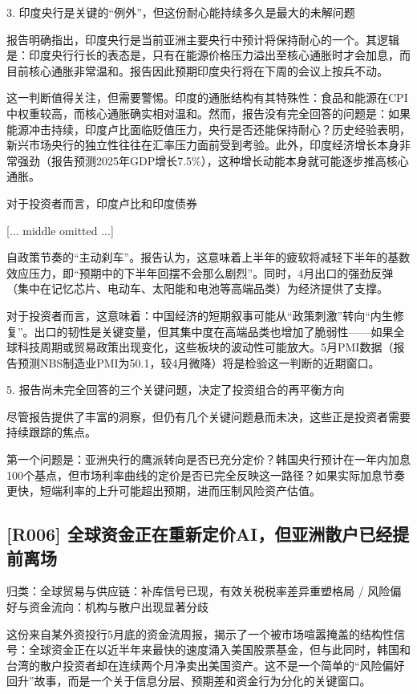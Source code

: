 \documentclass[11pt]{ctexart}
\begin{document}
3. 印度央行是关键的“例外”，但这份耐心能持续多久是最大的未解问题

报告明确指出，印度央行是当前亚洲主要央行中预计将保持耐心的一个。其逻辑是：印度央行行长的表态是，只有在能源价格压力溢出至核心通胀时才会加息，而目前核心通胀非常温和。报告因此预期印度央行将在下周的会议上按兵不动。

这一判断值得关注，但需要警惕。印度的通胀结构有其特殊性：食品和能源在CPI中权重较高，而核心通胀确实相对温和。然而，报告没有完全回答的问题是：如果能源冲击持续，印度卢比面临贬值压力，央行是否还能保持耐心？历史经验表明，新兴市场央行的独立性往往在汇率压力面前受到考验。此外，印度经济增长本身非常强劲（报告预测2025年GDP增长7.5\%），这种增长动能本身就可能逐步推高核心通胀。

对于投资者而言，印度卢比和印度债券

[... middle omitted ...]

自政策节奏的“主动刹车”。报告认为，这意味着上半年的疲软将减轻下半年的基数效应压力，即“预期中的下半年回摆不会那么剧烈”。同时，4月出口的强劲反弹（集中在记忆芯片、电动车、太阳能和电池等高端品类）为经济提供了支撑。

对于投资者而言，这意味着：中国经济的短期叙事可能从“政策刺激”转向“内生修复”。出口的韧性是关键变量，但其集中度在高端品类也增加了脆弱性——如果全球科技周期或贸易政策出现变化，这些板块的波动性可能放大。5月PMI数据（报告预测NBS制造业PMI为50.1，较4月微降）将是检验这一判断的近期窗口。

5. 报告尚未完全回答的三个关键问题，决定了投资组合的再平衡方向

尽管报告提供了丰富的洞察，但仍有几个关键问题悬而未决，这些正是投资者需要持续跟踪的焦点。

第一个问题是：亚洲央行的鹰派转向是否已充分定价？韩国央行预计在一年内加息100个基点，但市场利率曲线的定价是否已完全反映这一路径？如果实际加息节奏更快，短端利率的上升可能超出预期，进而压制风险资产估值。

\subsection{[R006] 全球资金正在重新定价AI，但亚洲散户已经提前离场}
{\small\color{refgray}归类：全球贸易与供应链：补库信号已现，有效关税税率差异重塑格局 / 风险偏好与资金流向：机构与散户出现显著分歧}

这份来自某外资投行5月底的资金流周报，揭示了一个被市场喧嚣掩盖的结构性信号：全球资金正在以近半年来最快的速度涌入美国股票基金，但与此同时，韩国和台湾的散户投资者却在连续两个月净卖出美国资产。这不是一个简单的“风险偏好回升”故事，而是一个关于信息分层、预期差和资金行为分化的关键窗口。
\end{document}
